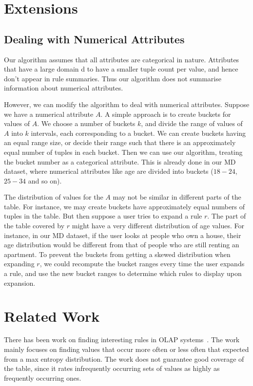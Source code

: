 \documentclass{sig-alternate}
\begin{document}
\section{Extensions}
\subsection{Dealing with Numerical Attributes}
Our algorithm assumes that all attributes are categorical in nature. Attributes that have a large domain d to have a smaller tuple count per value, and hence don't appear in rule summaries. Thus our algorithm does not summarise information about numerical attributes. 

However, we can modify the algorithm to deal with numerical attributes. Suppose we have a numerical attribute $A$. A simple approach is to create buckets for values of $A$. We choose a number of buckets $k$, and divide the range of values of $A$ into $k$ intervals, each corresponding to a bucket. We can create buckets having an equal range size, or decide their range such that there is an approximately equal number of tuples in each bucket. Then we can use our algorithm, treating the bucket number as a categorical attribute. This is already done in our MD dataset, where numerical attributes like age are divided into buckets ($18-24$, $25-34$ and so on).

The distribution of values for the $A$ may not be similar in different parts of the table. For instance, we may create buckets have approximately equal numbers of tuples in the table. But then suppose a user tries to expand a rule $r$. The part of the table covered by $r$ might have a very different distribution of age values. For instance, in our MD dataset, if the user looks at people who own a house, their age distribution would be different from that of people who are still renting an apartment. To prevent the buckets from getting a skewed distribution when expanding $r$, we could recompute the bucket ranges every time the user expands a rule, and use the new bucket ranges to determine which rules to display upon expansion. 

\section{Related Work}
There has been work on finding interesting rules in OLAP systems~\cite{Sarawagi:2001:UMA:767141.767148, Sarawagi00user-adaptiveexploration, Sarawagi98discovery-drivenexploration}. The work mainly focuses on finding values that occur more often or less often that expected from a max entropy distribution. The work does not guarantee good coverage of the table, since it rates infrequently occurring sets of values as highly as frequently occurring ones. 
\end{document}
